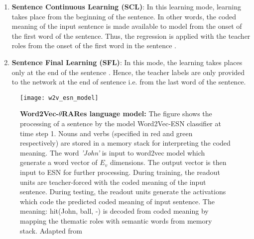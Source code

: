 \begin{enumerate}
\setlength{\itemsep}{\smallskipamount}

\item \textbf{Sentence Continuous Learning (SCL)}: In this learning mode, learning takes place from the beginning of the sentence. In other words, the coded meaning of the input sentence is made available to model from the onset of the first word of the sentence. Thus, the regression is applied with the teacher roles from the onset of the first word in the sentence \cite{xavier:2013:RT}. \label{eg:SCL}

\item \textbf{Sentence Final Learning (SFL)}: In this mode, the learning takes places only at the end of the sentence \cite{xavier:2013:RT}. Hence, the teacher labels are only provided to the network at the end of sentence i.e. from the last word of the sentence. \label{eg:SFL}

\end{enumerate} 

\begin{figure}[hbtp]
\centering
\texttt{[image: w2v\_esn\_model]}
\caption[Neural comprehension of Word2Vec-$\theta$RARes Model]{\textbf{Word2Vec-$\theta$RARes language model:} {\small The figure shows the processing of a sentence by the model Word2Vec-ESN classifier at time step 1. Nouns and verbs (specified in red and green respectively) are stored in a memory stack for interpreting the coded meaning. The word \textit{'John'} is input to word2vec model which generate a word vector of $E_{v}$ dimensions. The output vector is then input to ESN for further processing. During training, the readout units are teacher-forced with the coded meaning of the input sentence. During testing, the readout units generate the activations which code the predicted coded meaning of input sentence. The meaning: hit(John, ball, -) is decoded from coded meaning by mapping the thematic roles with semantic words from memory stack. Adapted from \cite{xavier:2013:RT}}} 
\label{fig:model_variant_1}
\end{figure}

